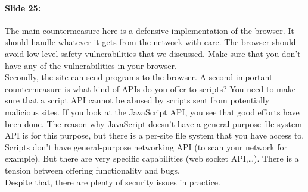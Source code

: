 \documentclass[10pt,a4paper]{report}
\begin{document}
\paragraph{Slide 25:} The main countermeasure here is a defensive implementation of the browser. It should handle whatever it gets from the network with care. The browser should avoid low-level safety vulnerabilities that we discussed. Make sure that you don't have any of the vulnerabilities in your browser.\\
Secondly, the site can send programs to the browser. A second important countermeasure is what kind of APIs do you offer to scripts? You need to make sure that a script API cannot be abused by scripts sent from potentially malicious sites. If you look at the JavaScript API, you see that good efforts have been done.
The reason why JavaScript doesn't have a general-purpose file system API is for this purpose, but there is a per-site file system that you have access to.\\
Scripts don't have general-purpose networking API (to scan your network for example). But there are very specific capabilities (web socket API,…). There is a tension between offering functionality and bugs. \\
Despite that, there are plenty of security issues in practice.
\end{document}
